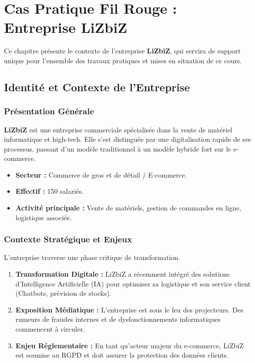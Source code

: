 
\chapter{Cas Pratique Fil Rouge : Entreprise LiZbiZ}\label{chap:01_cas_lizbiz}

Ce chapitre présente le contexte de l'entreprise \textbf{LiZbiZ}, qui servira de support unique pour l'ensemble des travaux pratiques et mises en situation de ce cours.

\section{Identité et Contexte de l'Entreprise}

\subsection{Présentation Générale}

\textbf{LiZbiZ} est une entreprise commerciale spécialisée dans la vente de matériel informatique et high-tech. Elle s'est distinguée par une digitalisation rapide de ses processus, passant d'un modèle traditionnel à un modèle hybride fort sur le e-commerce.

\begin{itemize}
    \item \textbf{Secteur :} Commerce de gros et de détail / E-commerce.
    \item \textbf{Effectif :} 150 salariés.
    \item \textbf{Activité principale :} Vente de matériels, gestion de commandes en ligne, logistique associée.
\end{itemize}

\subsection{Contexte Stratégique et Enjeux}

L'entreprise traverse une phase critique de transformation.
\begin{enumerate}
    \item \textbf{Transformation Digitale :} LiZbiZ a récemment intégré des solutions d'Intelligence Artificielle (IA) pour optimiser sa logistique et son service client (Chatbots, prévision de stocks).
    \item \textbf{Exposition Médiatique :} L'entreprise est sous le feu des projecteurs. Des rumeurs de fraudes internes et de dysfonctionnements informatiques commencent à circuler.
    \item \textbf{Enjeu Réglementaire :} En tant qu'acteur majeur du e-commerce, LiZbiZ est soumise au RGPD et doit assurer la protection des données clients.
\end{enumerate}

